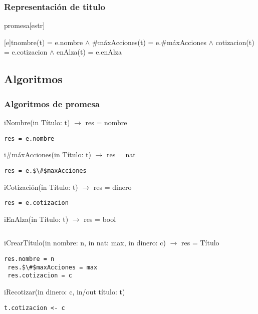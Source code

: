 \subsubsection{Representaci\'on de titulo}
\begin{Estructura}{promesa}[estr]
    \begin{Tupla}[estr]
    \end{Tupla}
\end{Estructura}


[e]{t}{nombre(t) = e.nombre $\land$ $\#$m\'axAcciones(t) = e.$\#$m\'axAcciones $\land$ cotizacion(t) = e.cotizacion $\land$ enAlza(t) = e.enAlza}

  \subsection{Algoritmos}
\subsubsection{Algoritmos de promesa}

iNombre(in T\'itulo: t) $\rightarrow$ res = nombre
\begin{lstlisting}[mathescape]
 res = e.nombre
\end{lstlisting}

i$\#$m\'axAcciones(in T\'itulo: t) $\rightarrow$ res = nat
\begin{lstlisting}[mathescape]
 res = e.$\#$maxAcciones
\end{lstlisting}

iCotizaci\'on(in T\'itulo: t) $\rightarrow$ res = dinero
\begin{lstlisting}[mathescape]
 res = e.cotizacion
\end{lstlisting}


iEnAlza(in Titulo: t) $\rightarrow$ res = bool
\begin{lstlisting}[mathescape]
%%%%%%%%%%
\end{lstlisting}

iCrearT\'itulo(in nombre: n, in nat: max, in dinero: c) $\rightarrow$ res = T\'itulo
\begin{lstlisting}[mathescape]
 res.nombre = n
 res.$\#$maxAcciones = max
 res.cotizacion = c
\end{lstlisting}

iRecotizar(in dinero: c, in/out t\'itulo: t)
\begin{lstlisting}[mathescape]
 t.cotizacion <- c
\end{lstlisting}
